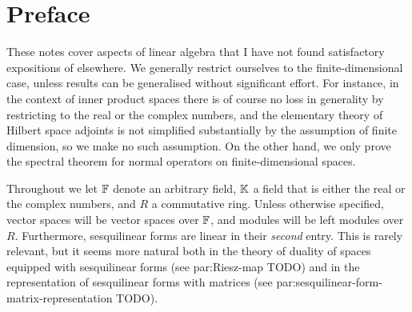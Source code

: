 \chapter{Preface}

These notes cover aspects of linear algebra that I have not found satisfactory expositions of elsewhere. We generally restrict ourselves to the finite-dimensional case, unless results can be generalised without significant effort. For instance, in the context of inner product spaces there is of course no loss in generality by restricting to the real or the complex numbers, and the elementary theory of Hilbert space adjoints is not simplified substantially by the assumption of finite dimension, so we make no such assumption. On the other hand, we only prove the spectral theorem for normal operators on finite-dimensional spaces.

Throughout we let $\mathbb{F}$ denote an arbitrary field, $\mathbb{K}$ a field that is either the real or the complex numbers, and $R$ a commutative ring. Unless otherwise specified, vector spaces will be vector spaces over $\mathbb{F}$, and modules will be left modules over $R$. Furthermore, sesquilinear forms are linear in their \emph{second} entry. This is rarely relevant, but it seems more natural both in the theory of duality of spaces equipped with sesquilinear forms (see {par:Riesz-map} TODO) and in the representation of sesquilinear forms with matrices (see {par:sesquilinear-form-matrix-representation} TODO).